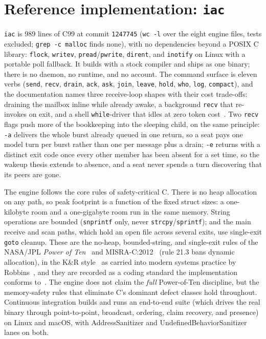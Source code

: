 \documentclass[11pt]{article}
\newcommand{\code}[1]{\texttt{#1}}
\begin{document}
\section{Reference implementation: \code{iac}}

\code{iac} is 989 lines of C99 at commit \code{1247745} (\code{wc -l} over the eight engine files, tests excluded; \code{grep -c malloc} finds none), with no dependencies beyond a POSIX C library: \code{flock}, \code{writev}, \code{pread}/\code{pwrite}, \code{dirent}, and \code{inotify} on Linux with a portable poll fallback. It builds with a stock compiler and ships as one binary; there is no daemon, no runtime, and no account. The command surface is eleven verbs (\code{send}, \code{recv}, \code{drain}, \code{ack}, \code{ask}, \code{join}, \code{leave}, \code{hold}, \code{who}, \code{log}, \code{compact}), and the documentation names three receive-loop shapes with their cost trade-offs: draining the mailbox inline while already awake, a background \code{recv} that re-invokes on exit, and a shell \code{while}-driver that idles at zero token cost~\cite{repo}. Two \code{recv} flags push more of the bookkeeping into the sleeping child, on the same principle: \code{-a} delivers the whole burst already queued in one return, so a seat pays one model turn per burst rather than one per message plus a drain; \code{-e} returns with a distinct exit code once every other member has been absent for a set time, so the wakeup thesis extends to absence, and a seat never spends a turn discovering that its peers are gone.

The engine follows the core rules of safety-critical C. There is no heap allocation on any path, so peak footprint is a function of the fixed struct sizes: a one-kilobyte room and a one-gigabyte room run in the same memory. String operations are bounded (\code{snprintf} only, never \code{strcpy}/\code{sprintf}); and the main receive and scan paths, which hold an open file across several exits, use single-exit \code{goto} cleanup. These are the no-heap, bounded-string, and single-exit rules of the NASA/JPL \emph{Power of Ten}~\cite{holzmann2006} and MISRA-C:2012~\cite{misra2012} (rule 21.3 bans dynamic allocation), in the K\&R style~\cite{kernighan1988} as carried into modern systems practice by Robbins~\cite{robbins2004}, and they are recorded as a coding standard the implementation conforms to~\cite{repo}. The engine does not claim the \emph{full} Power-of-Ten discipline, but the memory-safety rules that eliminate C's dominant defect classes hold throughout. Continuous integration builds and runs an end-to-end suite (which drives the real binary through point-to-point, broadcast, ordering, claim recovery, and presence) on Linux and macOS, with AddressSanitizer and UndefinedBehaviorSanitizer lanes on both.
\end{document}
